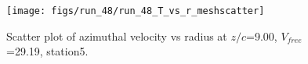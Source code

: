 \begin{figure}[H]
\centering
\texttt{[image: figs/run\_48/run\_48\_T\_vs\_r\_meshscatter]}
\caption{Scatter plot of azimuthal velocity vs radius at $z/c$=9.00, $V_{free}$=29.19, station5.}
\label{fig:run_48_T_vs_r_meshscatter}
\end{figure}


